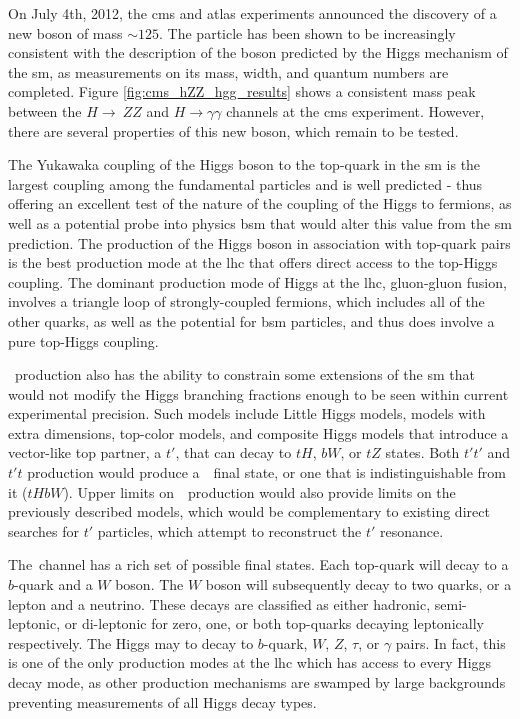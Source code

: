 \par On July 4th, 2012, the \acrfull{cms} and \acrfull{atlas} experiments announced the discovery of a new boson of mass $\sim125$\GeV \cite{CMS:2012discovery}\cite{ATLAS:2012discovery}.  The particle has been shown to be increasingly consistent with the description of the boson predicted by the Higgs mechanism of the \acrshort{sm}, as measurements on its mass, width, and quantum numbers are completed.  Figure \ref{fig:cms_hZZ_hgg_results} shows a consistent mass peak between the $H\rightarrow~ZZ$ and $H\rightarrow\gamma\gamma$ channels at the \acrshort{cms} experiment.  However, there are several properties of this new boson, which remain to be tested. 

\par The Yukawaka coupling of the Higgs boson to the top-quark in the \acrshort{sm} is the largest coupling among the fundamental particles and is well 
predicted - thus offering an excellent test of the nature of the coupling of the Higgs to fermions, as well as a potential probe into physics \acrfull{bsm} that would alter this value from the \acrshort{sm} prediction.  The production of the Higgs boson in association with top-quark pairs is the best production mode at the \acrshort{lhc} that offers direct access to the top-Higgs coupling.  The dominant production mode of Higgs at the \acrshort{lhc}, gluon-gluon fusion, involves a triangle loop of strongly-coupled fermions, which includes all of the other quarks, as well as the potential for \acrshort{bsm} particles, and thus does involve a pure top-Higgs coupling.  

\par ~\ttH production also has the ability to constrain some extensions of the \acrshort{sm} that would not modify the Higgs branching fractions enough to be seen 
within current experimental precision.  Such models include Little Higgs models, models with extra dimensions, top-color models, and composite Higgs models that introduce a vector-like top partner, a $t'$, that can decay to $tH$, $bW$, or $tZ$ states.  Both $t't'$ and $t't$ production would produce a~\ttH~final state, or one that is indistinguishable from it ($tHbW$).  Upper limits on~\ttH~production would also provide limits on the previously described models, which would be complementary to existing direct searches for $t'$ particles, which attempt to reconstruct the $t'$ resonance.  

\par The~\ttH channel has a rich set of possible final states.  Each top-quark will decay to a $b$-quark and a $W$ boson.  The $W$ boson will subsequently decay to two quarks, or a lepton and a neutrino.  These decays are classified as either hadronic, semi-leptonic, or di-leptonic for zero, one, or both top-quarks decaying leptonically 
respectively.  The Higgs may to decay to $b$-quark, $W$, $Z$, $\tau$, or $\gamma$ pairs.  In fact, this is one of the only production modes at the \acrshort{lhc} which 
has access to every Higgs decay mode, as other production mechanisms are swamped by large backgrounds preventing measurements of all Higgs decay types.  

